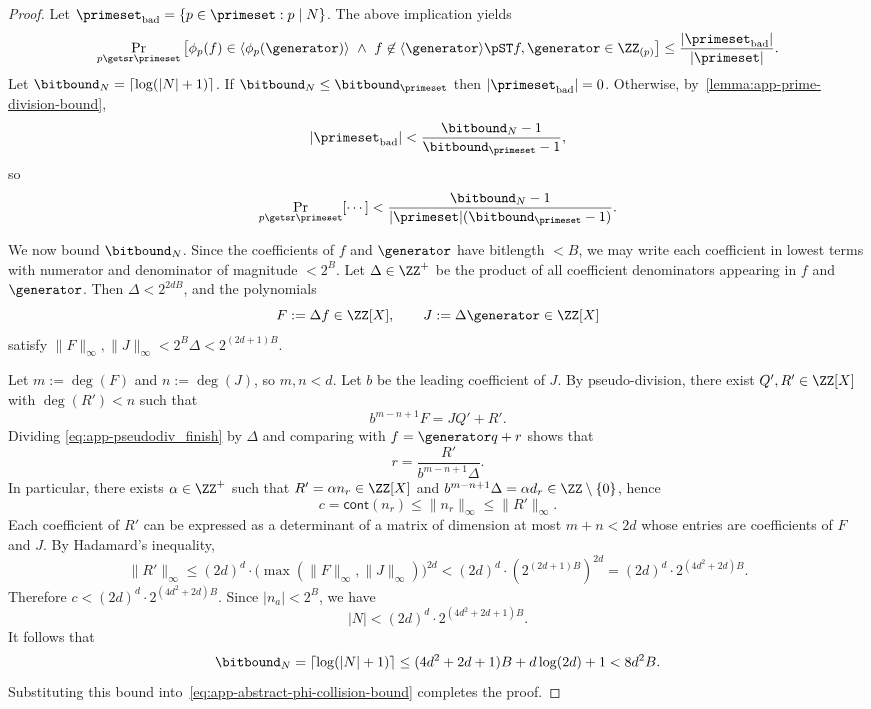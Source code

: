 \begin{proof}
Let $\primeset_\textnormal{bad} = \{p \in \primeset : p \mid N\}$. The above implication yields
\[
\Pr_{p \getsr \primeset}\left[\phi_p(f) \in \langle \phi_p(\generator) \rangle \ \wedge\ f \not\in \langle \generator \rangle \pST f,\generator \in \ZZ_{(p)}\right]
\le \frac{|\primeset_\textnormal{bad}|}{|\primeset|}.
\]
Let $\bitbound_N = \lceil \log(|N|+1) \rceil$. If $\bitbound_N \le \bitbound_\primeset$ then $|\primeset_\textnormal{bad}|=0$.
Otherwise, by~\cref{lemma:app-prime-division-bound},
\[
|\primeset_\textnormal{bad}| < \frac{\bitbound_N-1}{\bitbound_\primeset-1},
\]
so
\begin{equation}
\label{eq:app-abstract-phi-collision-bound}
\Pr_{p \getsr \primeset}[\cdots]
< \frac{\bitbound_N-1}{|\primeset|(\bitbound_\primeset-1)}.
\end{equation}

We now bound $\bitbound_N$. Since the coefficients of $f$ and $\generator$ have bitlength $<B$, we may write each coefficient in lowest
terms with numerator and denominator of magnitude $<2^B$. Let $\Delta\in \ZZ^{+}$ be the product of all coefficient denominators appearing
in $f$ and $\generator$. Then $\Delta < 2^{2dB}$, and the polynomials
\[
F := \Delta f \in \ZZ[X], \qquad J := \Delta \generator \in \ZZ[X]
\]
satisfy $\|F\|_\infty,\|J\|_\infty < 2^B \Delta < 2^{(2d+1)B}$.

Let $m := \deg(F)$ and $n := \deg(J)$, so $m,n < d$. Let $b$ be the leading coefficient of $J$. By pseudo-division, there exist
$Q',R' \in \ZZ[X]$ with $\deg(R')<n$ such that
\begin{equation}\label{eq:app-pseudodiv_finish}
b^{m-n+1} F = J Q' + R'.
\end{equation}
Dividing \eqref{eq:app-pseudodiv_finish} by $\Delta$ and comparing with $f=\generator q + r$ shows that
\[
r = \frac{R'}{b^{m-n+1}\Delta}.
\]
In particular, there exists $\alpha\in\ZZ^{+}$ such that $R'=\alpha n_r \in \ZZ[X]$ and $b^{m-n+1}\Delta=\alpha d_r \in \ZZ\setminus\{0\}$,
hence
\[
c = \mathsf{cont}(n_r) \le \|n_r\|_\infty \le \|R'\|_\infty.
\]
Each coefficient of $R'$ can be expressed as a determinant of a matrix of dimension at most $m+n < 2d$ whose entries are coefficients of $F$
and $J$. By Hadamard's inequality,
\[
\|R'\|_\infty \le (2d)^d \cdot \bigl(\max(\|F\|_\infty,\|J\|_\infty)\bigr)^{2d}
< (2d)^d \cdot \left(2^{(2d+1)B}\right)^{2d}
= (2d)^d \cdot 2^{(4d^2+2d)B}.
\]
Therefore $c < (2d)^d \cdot 2^{(4d^2+2d)B}$. Since $|n_a|<2^B$, we have
\[
|N| < (2d)^d \cdot 2^{(4d^2+2d+1)B}.
\]
It follows that
\[
\bitbound_N = \lceil \log(|N|+1) \rceil \le (4d^2+2d+1)B + d\log(2d) + 1 < 8 d^2 B.
\]
Substituting this bound into~\cref{eq:app-abstract-phi-collision-bound} completes the proof.
\end{proof}

